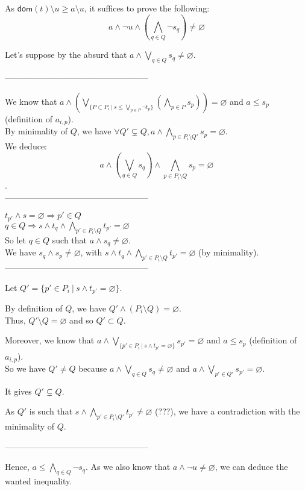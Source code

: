 \documentclass[a4paper]{article}%
\newcommand{\dom}[1]{\textsf{dom}(#1)}
\newcommand{\alt}{~|~}
\begin{document}
    As $ \dom t \setminus u \geq a \setminus u$, it suffices to prove the following:
    \[ a \land \neg u \land (\bigwedge_{q\in Q} \neg s_q) \neq \varnothing \]

    Let's suppose by the absurd that $a \land \bigvee_{q\in Q} s_q \neq \varnothing$.

    ---------------------------------------------------

    We know that $a \land \left(\bigvee_{\{P \subset P_i\alt s \leq \bigvee_{p \in P} \neg t_p\}} \left(\bigwedge_{p \in P} s_p\right) \right) = \varnothing$ and $a \leq s_p$ (definition of $a_{i,p}$).\\
    By minimality of $Q$, we have $\forall Q' \subsetneq Q, a \land \bigwedge_{p \in P_i\setminus Q'} s_p = \varnothing$.\\

    We deduce:
    \[a \land (\bigvee_{q\in Q} s_q) \land \bigwedge_{p \in P_i\setminus Q} s_p = \varnothing\].\\

    ---------------------------------------------------

    $t_{p'} \land s = \varnothing \Rightarrow p' \in Q$\\
    $q \in Q \Rightarrow  s \land t_q \land \bigwedge_{p' \in P_i\setminus Q} t_{p'} = \varnothing$\\

    So let $q \in Q$ such that $a \land s_q \neq \varnothing$.\\
    We have $s_q \land s_p \neq \varnothing$, with $s \land t_q \land \bigwedge_{p' \in P_i\setminus Q} t_{p'} = \varnothing$ (by minimality).\\

    ---------------------------------------------------

    Let $Q' = \{p'\in P_i\alt s\wedge t_{p'}=\varnothing\}$.

    By definition of $Q$, we have $Q' \land (P_i \setminus Q) = \varnothing$.\\
    Thus, $Q' \setminus Q = \varnothing$ and so $Q' \subset Q$.

    Moreover, we know that $a \land \bigvee_{\{p'\in P_i\alt s\wedge t_{p'}=\varnothing\}} s_{p'} = \varnothing$ and $a \leq s_p$ (definition of $a_{i,p}$).\\
    So we have $Q' \neq Q$ because $a \land \bigvee_{q\in Q} s_q \neq \varnothing$ and $a \land \bigvee_{p'\in Q'} s_{p'} = \varnothing$.

    It gives $Q' \subsetneq Q$.

    As $Q'$ is such that $s \land \bigwedge_{p' \in P_i\setminus Q'} t_{p'} \neq \varnothing$ (???), we have a contradiction with the minimality of $Q$.

    ---------------------------------------------------

    Hence, $a \leq \bigwedge_{q\in Q} \neg s_q$. As we also know that $a \land \neg u \neq \varnothing$, we can deduce the wanted inequality.
\end{document}

